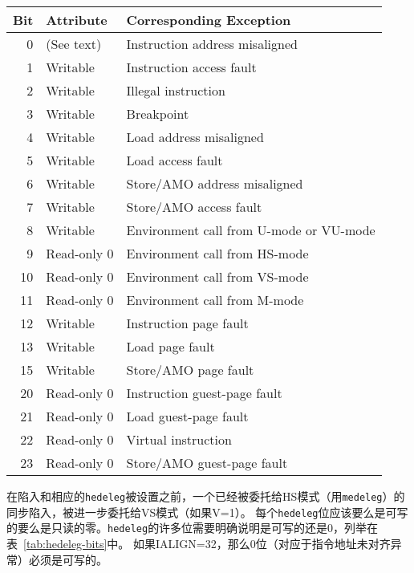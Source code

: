 \begin{table*}[h!]
\begin{center}
\begin{tabular}{|r|l|l|}
\hline
Bit & Attribute   & Corresponding Exception \\
\hline
 0  & (See text)  & Instruction address misaligned \\
 1  & Writable    & Instruction access fault \\
 2  & Writable    & Illegal instruction \\
 3  & Writable    & Breakpoint \\
 4  & Writable    & Load address misaligned \\
 5  & Writable    & Load access fault \\
 6  & Writable    & Store/AMO address misaligned \\
 7  & Writable    & Store/AMO access fault \\
 8  & Writable    & Environment call from U-mode or VU-mode \\
 9  & Read-only 0 & Environment call from HS-mode \\
10  & Read-only 0 & Environment call from VS-mode \\
11  & Read-only 0 & Environment call from M-mode \\
12  & Writable    & Instruction page fault \\
13  & Writable    & Load page fault \\
15  & Writable    & Store/AMO page fault \\
20  & Read-only 0 & Instruction guest-page fault \\
21  & Read-only 0 & Load guest-page fault \\
22  & Read-only 0 & Virtual instruction \\
23  & Read-only 0 & Store/AMO guest-page fault \\
\hline
\end{tabular}
\end{center}
\caption{Bits of {\tt hedeleg} that must be writable or must be read-only
zero.}
\label{tab:hedeleg-bits}
\end{table*}

在陷入和相应的{\tt hedeleg}被设置之前，一个已经被委托给HS模式（用{\tt medeleg}）的同步陷入，被进一步委托给VS模式（如果V=1）。
每个{\tt hedeleg}位应该要么是可写的要么是只读的零。{\tt hedeleg}的许多位需要明确说明是可写的还是0，列举在表~\ref{tab:hedeleg-bits}中。
如果IALIGN=32，那么0位（对应于指令地址未对齐异常）必须是可写的。

